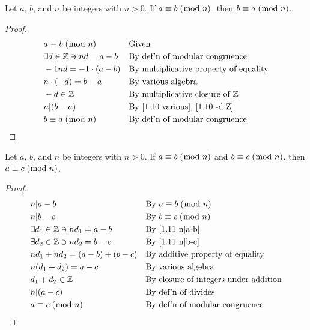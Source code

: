 \documentclass[../main.tex]{subfiles}
\begin{document}
\begin{thm} \label{1.10}
Let $a$, $b$, and $n$ be integers with $n > 0$. If $a \equiv b \; (\bmod \; n)$, then $b \equiv a \; (\bmod \; n)$.
\end{thm}

\begin{proof}
\begin{align}
    &a \equiv b \; (\bmod \; n) && \mbox{Given} \\
    &\exists d \in \mathbb{Z} \ni nd = a - b && \mbox{By def'n of modular congruence} \\
    &-1nd = -1 \cdot (a-b) && \mbox{By multiplicative property of equality} \\
    \label{1.10 various}
    &n \cdot (-d) = b - a && \mbox{By various algebra} \\
    \label{1.10 -d Z}
    &-d \in \mathbb{Z} && \mbox{By multiplicative closure of $\mathbb{Z}$} \\
    &n|(b-a) && \mbox{By \eqref{1.10 various}, \eqref{1.10 -d Z}} \\
    &b \equiv a \; (\bmod \; n) && \mbox{By def'n of modular congruence} \qedhere
\end{align}
\end{proof}



\begin{thm} \label{1.11}
Let $a$, $b$, and $n$ be integers with $n > 0$. If $a \equiv b \; (\bmod \; n)$ and $ b \equiv c \; (\bmod \; n)$, then $a \equiv c \; (\bmod \; n)$.
\end{thm}

\begin{proof}
\begin{align}
    \label{1.11 n|a-b}
    &n|a-b && \mbox{By $a \equiv b \; (\bmod \; n)$} \\
    \label{1.11 n|b-c}
    &n|b-c && \mbox{By $b \equiv c \; (\bmod \; n)$} \\
    &\exists d_1 \in \mathbb{Z} \ni nd_1 = a-b && \mbox{By \eqref{1.11 n|a-b}} \\
    &\exists d_2 \in \mathbb{Z} \ni nd_2 = b-c && \mbox{By \eqref{1.11 n|b-c}} \\
    &nd_1 + nd_2 = (a-b) + (b-c) && \mbox{By additive property of equality} \\
    &n(d_1 + d_2) = a - c && \mbox{By various algebra} \\
    &d_1 + d_2 \in \mathbb{Z} && \mbox{By closure of integers under addition} \\
    &n|(a-c) && \mbox{By def'n of divides} \\
    &a \equiv c \; (\bmod \; n) && \mbox{By def'n of modular congruence} \qedhere
\end{align}
\end{proof}
\end{document}
